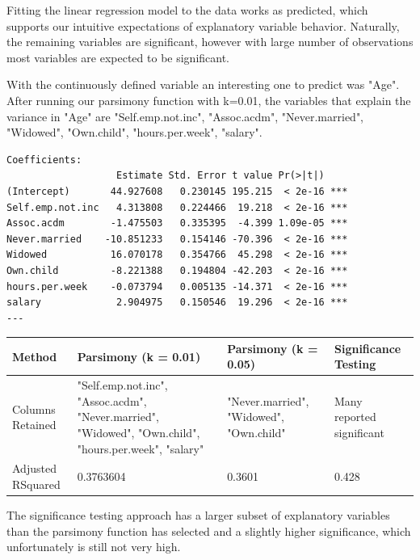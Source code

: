 \documentclass[letter]{article}
\begin{document}
Fitting the linear regression model to the data works as predicted, which supports our intuitive expectations of explanatory variable behavior. Naturally, the remaining variables are significant, however with large number of observations most variables are expected to be significant. 


With the continuously defined variable an interesting one to predict was "Age". After running our parsimony function with k=0.01, the variables that explain the variance in "Age" are "Self.emp.not.inc", "Assoc.acdm", "Never.married", "Widowed", "Own.child", "hours.per.week", "salary".   

\begin{verbatim}
Coefficients:
                   Estimate Std. Error t value Pr(>|t|)    
(Intercept)       44.927608   0.230145 195.215  < 2e-16 ***
Self.emp.not.inc   4.313808   0.224466  19.218  < 2e-16 ***
Assoc.acdm        -1.475503   0.335395  -4.399 1.09e-05 ***
Never.married    -10.851233   0.154146 -70.396  < 2e-16 ***
Widowed           16.070178   0.354766  45.298  < 2e-16 ***
Own.child         -8.221388   0.194804 -42.203  < 2e-16 ***
hours.per.week    -0.073794   0.005135 -14.371  < 2e-16 ***
salary             2.904975   0.150546  19.296  < 2e-16 ***
---
\end{verbatim}

\begin{center}
    \begin{tabular}{ | l |  p{4cm} |  p{4cm} | p{4cm} |}
    \hline
    Method & Parsimony (k = 0.01) & Parsimony (k = 0.05) & Significance Testing \\ \hline
    	
    Columns Retained & "Self.emp.not.inc", "Assoc.acdm", "Never.married", "Widowed", "Own.child", "hours.per.week", "salary" & "Never.married", "Widowed", "Own.child" & Many reported significant\\ \hline
    
    Adjusted RSquared & 0.3763604 & 0.3601  & 0.428\\ \hline
    
    \end{tabular}
\end{center}

The significance testing approach has a larger subset of explanatory variables than the parsimony function has selected and a slightly higher significance, which unfortunately is still not very high.
\end{document}
